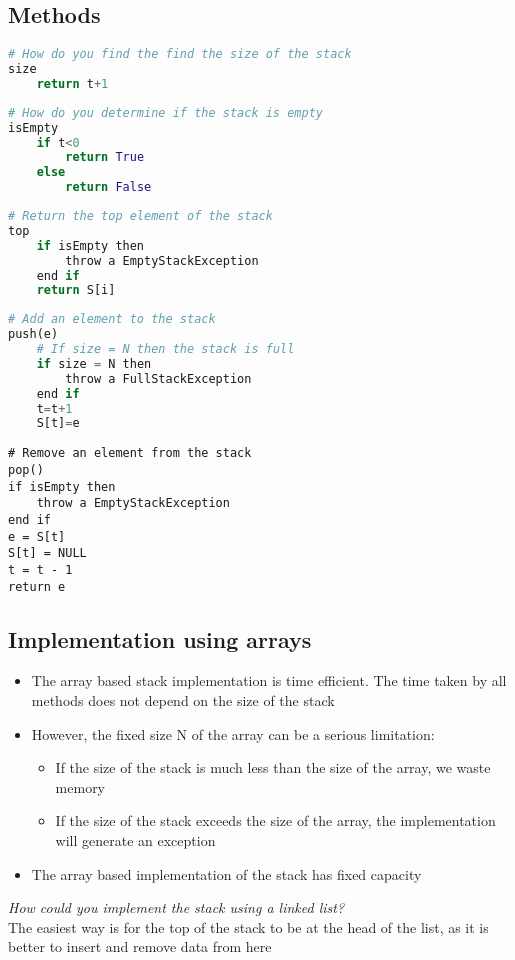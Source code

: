 \documentclass{article}[18pt]
\begin{document}
\subsection{Methods}
\begin{lstlisting}[mathescape=true, language=Python]
# How do you find the find the size of the stack
size
	return t+1
\end{lstlisting}

\begin{lstlisting}[mathescape=true, language=Python]
# How do you determine if the stack is empty
isEmpty
	if t<0
		return True
	else
		return False
\end{lstlisting}
\begin{lstlisting}[mathescape=true, language=Python]
# Return the top element of the stack
top
	if isEmpty then
		throw a EmptyStackException
	end if
	return S[i]
\end{lstlisting}
\begin{lstlisting}[mathescape=true, language=Python]
# Add an element to the stack
push(e)
	# If size = N then the stack is full
	if size = N then
		throw a FullStackException
	end if
	t=t+1
	S[t]=e
\end{lstlisting}
\begin{lstlisting}[mathescape=true]
# Remove an element from the stack
pop()
if isEmpty then
	throw a EmptyStackException
end if
e = S[t]
S[t] = NULL
t = t - 1
return e
\end{lstlisting}
\subsection{Implementation using arrays}
\begin{itemize}
\item The array based stack implementation is time efficient. The time taken by all methods does not depend on the size of the stack
\item However, the fixed size N of the array can be a serious limitation:
\begin{itemize}
\item If the size of the stack is much less than the size of the array, we waste memory
\item If the size of the stack exceeds the size of the array, the implementation will generate an exception
\end{itemize}
\item The array based implementation of the stack has fixed capacity
\end{itemize}
\textit{How could you implement the stack using a linked list?}\\
The easiest way is for the top of the stack to be at the head of the list, as it is better to insert and remove data from here
\end{document}
